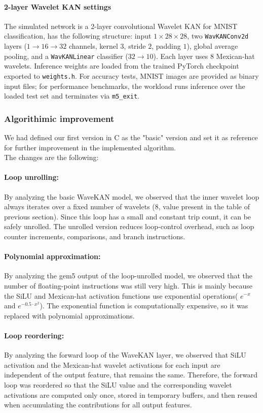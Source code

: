 \documentclass[11pt,a4paper,twocolumn]{article}
\begin{document}
\paragraph{2-layer Wavelet KAN settings}
The simulated network is a 2-layer convolutional Wavelet KAN for MNIST classification, has the following structure: input $1\times28\times28$, two \texttt{WavKANConv2d} layers ($1\!\rightarrow\!16\!\rightarrow\!32$ channels, kernel $3$, stride $2$, padding $1$), global average pooling, and a \texttt{WavKANLinear} classifier ($32\!\rightarrow\!10$).
Each layer uses 8 Mexican-hat wavelets.
Inference weights are loaded from the trained PyTorch checkpoint exported to \texttt{weights.h}.
For accuracy tests, MNIST images are provided as binary input files; for performance benchmarks, the workload runs inference over the loaded test set and terminates via \texttt{m5\_exit}.
\subsubsection{Algorithimic improvement}
We had defined our first version in C as the "basic" version and set it as reference 
for further improvement in the implemented algorithm.
\\
The changes are the following:
\paragraph{Loop unrolling:}By analyzing the basic WaveKAN model, 
we observed that the inner wavelet loop always iterates over a fixed 
number of wavelets ($8$, value present in the table of previous section).
Since this loop has a small and constant trip count, it can be safely 
unrolled. The unrolled version reduces loop-control overhead, such as 
loop counter increments, comparisons, and branch instructions.
\paragraph{Polynomial approximation:}By analyzing the gem5 output of the 
loop-unrolled model, we observed that the number of floating-point 
instructions was still very high. This is mainly because the SiLU and 
Mexican-hat activation functions use exponential operations( $e^{-x}$ and 
$e^{-0.5\cdot x^2}$). The exponential function is computationally expensive, 
so it was replaced with polynomial approximations.
\paragraph{Loop reordering:} By analyzing the forward loop of the WaveKAN 
layer, we observed that SiLU activation and the Mexican-hat wavelet 
activations for each input are independent of the output feature, that 
remains the same. Therefore, the forward loop was reordered so that the 
SiLU value and the corresponding wavelet activations are computed only 
once, stored in temporary buffers, and then reused when accumulating the 
contributions for all output features.
\end{document}
